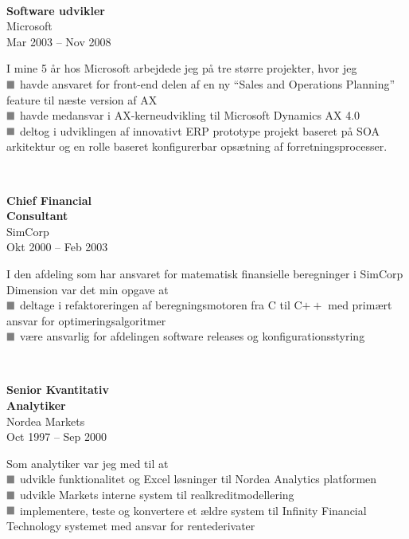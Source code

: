 \documentclass[10pt, a4paper]{article}
\newcommand*{\greysquare}{\textcolor{gray}{\blacksquare}}
\begin{document}
\\[0.5cm]
\begin{Row}%
  \begin{Cell}{1}
    \textbf{Software udvikler} \\ [1ex]
    Microsoft \\
    Mar 2003 -- Nov 2008 %
  \end{Cell}
  \begin{Cell}{3}
    I mine 5 år hos Microsoft arbejdede jeg på tre større projekter, hvor jeg \\ [1ex]
    $\greysquare$ havde ansvaret for front-end delen af en ny ``Sales and Operations Planning'' feature til næste version af AX \\
    $\greysquare$ havde medansvar i AX-kerneudvikling til Microsoft Dynamics AX 4.0 \\
    $\greysquare$ deltog i udviklingen af innovativt ERP prototype projekt baseret på SOA arkitektur og en rolle baseret konfigurerbar opsætning af forretningsprocesser.
  \end{Cell}
\end{Row}
\\[0.5cm]
\begin{Row}%
  \begin{Cell}{1}
    \textbf{Chief Financial \\
    Consultant} \\ [1ex]
    SimCorp \\
    Okt 2000 -- Feb 2003 %
  \end{Cell}
  \begin{Cell}{3}
    I den afdeling som har ansvaret for matematisk finansielle beregninger i SimCorp Dimension var det min opgave at \\ [1ex]
    $\greysquare$ deltage i refaktoreringen af beregningsmotoren fra C til C$++$ med primært ansvar for optimeringsalgoritmer \\
    $\greysquare$ være ansvarlig for afdelingen software releases og konfigurationsstyring
  \end{Cell}
\end{Row}
\\[0.5cm]
\begin{Row}%
  \begin{Cell}{1}
    \textbf{Senior Kvantitativ \\
    Analytiker} \\ [1ex]
    Nordea Markets \\
    Oct 1997 -- Sep 2000 %
  \end{Cell}
  \begin{Cell}{3}
    Som analytiker var jeg med til at \\ [1ex]
    $\greysquare$ udvikle funktionalitet og Excel løsninger til Nordea Analytics platformen \\
    $\greysquare$ udvikle Markets interne system til realkreditmodellering \\
    $\greysquare$ implementere, teste og konvertere et ældre system til Infinity Financial Technology systemet med ansvar for rentederivater
  \end{Cell}
\end{Row}
\end{document}
